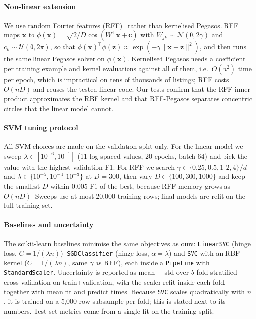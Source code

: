 \paragraph{Non-linear extension}
We use random Fourier features (RFF)~\cite{rff} rather than kernelised
Pegasos. RFF maps $\mathbf{x}$ to
$\phi(\mathbf{x})=\sqrt{2/D}\cos(W^{\top}\mathbf{x}+\mathbf{c})$ with
$W_{jk}\sim\mathcal{N}(0,2\gamma)$ and $c_k\sim\mathcal{U}(0,2\pi)$, so
that $\phi(\mathbf{x})^{\top}\phi(\mathbf{z})\approx
\exp(-\gamma\lVert\mathbf{x}-\mathbf{z}\rVert^{2})$, and then runs the
same linear Pegasos solver on $\phi(\mathbf{x})$. Kernelised Pegasos
needs a coefficient per training example and kernel evaluations against
all of them, i.e.\ $O(n^{2})$ time per epoch, which is impractical on
tens of thousands of listings; RFF costs $O(nD)$ and reuses the tested
linear code. Our tests confirm that the RFF inner product approximates
the RBF kernel and that RFF-Pegasos separates concentric circles that
the linear model cannot.

\paragraph{SVM tuning protocol}
All SVM choices are made on the validation split only. For the linear
model we sweep $\lambda\in[10^{-6},10^{-1}]$ (11 log-spaced values,
20 epochs, batch 64) and pick the value with the highest validation F1.
For RFF we search $\gamma\in\{0.25,0.5,1,2,4\}/d$ and
$\lambda\in\{10^{-5},10^{-4},10^{-3}\}$ at $D=300$, then vary
$D\in\{100,300,1000\}$ and keep the smallest $D$ within $0.005$ F1 of
the best, because RFF memory grows as $O(nD)$. Sweeps use at most
20{,}000 training rows; final models are refit on the full training set.

\paragraph{Baselines and uncertainty}
The scikit-learn baselines minimise the same objectives as ours:
\texttt{LinearSVC} (hinge loss, $C=1/(\lambda n)$),
\texttt{SGDClassifier} (hinge loss, $\alpha=\lambda$) and \texttt{SVC}
with an RBF kernel ($C=1/(\lambda n)$, same $\gamma$ as RFF), each
inside a \texttt{Pipeline} with \texttt{StandardScaler}. Uncertainty is
reported as mean $\pm$ std over 5-fold stratified cross-validation on
train+validation, with the scaler refit inside each fold, together with
mean fit and predict times. Because \texttt{SVC} scales quadratically
with $n$, it is trained on a 5{,}000-row subsample per fold; this is
stated next to its numbers. Test-set metrics come from a single fit on
the training split.

